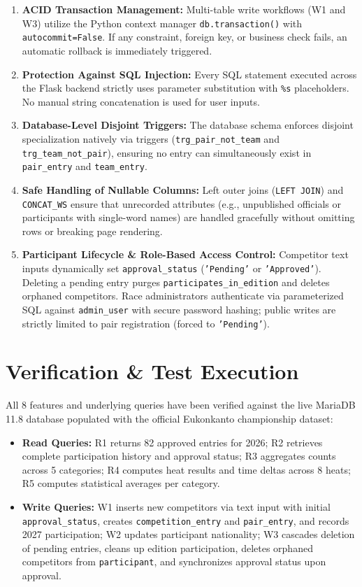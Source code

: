 \documentclass[11pt,a4paper]{article}
\begin{document}
\begin{enumerate}[leftmargin=1.5em, itemsep=1.2pt, topsep=1pt]
  \item \textbf{ACID Transaction Management:} Multi-table write workflows (W1 and W3) utilize the Python context manager \texttt{db.transaction()} with \texttt{autocommit=False}. If any constraint, foreign key, or business check fails, an automatic rollback is immediately triggered.
  \item \textbf{Protection Against SQL Injection:} Every SQL statement executed across the Flask backend strictly uses parameter substitution with \texttt{\%s} placeholders. No manual string concatenation is used for user inputs.
  \item \textbf{Database-Level Disjoint Triggers:} The database schema enforces disjoint specialization natively via triggers (\texttt{trg\_pair\_not\_team} and \texttt{trg\_team\_not\_pair}), ensuring no entry can simultaneously exist in \texttt{pair\_entry} and \texttt{team\_entry}.
  \item \textbf{Safe Handling of Nullable Columns:} Left outer joins (\texttt{LEFT JOIN}) and \texttt{CONCAT\_WS} ensure that unrecorded attributes (e.g., unpublished officials or participants with single-word names) are handled gracefully without omitting rows or breaking page rendering.
  \item \textbf{Participant Lifecycle \& Role-Based Access Control:} Competitor text inputs dynamically set \texttt{approval\_status} (\texttt{'Pending'} or \texttt{'Approved'}). Deleting a pending entry purges \texttt{participates\_}\allowbreak\texttt{in\_edition} and deletes orphaned competitors. Race administrators authenticate via parameterized SQL against \texttt{admin\_user} with secure password hashing; public writes are strictly limited to pair registration (forced to \texttt{'Pending'}).
\end{enumerate}

\vspace{0.15em}

\section{Verification \& Test Execution}
All 8 features and underlying queries have been verified against the live MariaDB 11.8 database populated with the official Eukonkanto championship dataset:
\begin{itemize}[leftmargin=1.5em, itemsep=1pt, topsep=1pt]
  \item \textbf{Read Queries:} R1 returns 82 approved entries for 2026; R2 retrieves complete participation history and approval status; R3 aggregates counts across 5 categories; R4 computes heat results and time deltas across 8 heats; R5 computes statistical averages per category.
  \item \textbf{Write Queries:} W1 inserts new competitors via text input with initial \texttt{approval\_status}, creates \texttt{competition\_entry} and \texttt{pair\_entry}, and records 2027 participation; W2 updates participant nationality; W3 cascades deletion of pending entries, cleans up edition participation, deletes orphaned competitors from \texttt{participant}, and synchronizes approval status upon approval.
\end{itemize}
\end{document}
